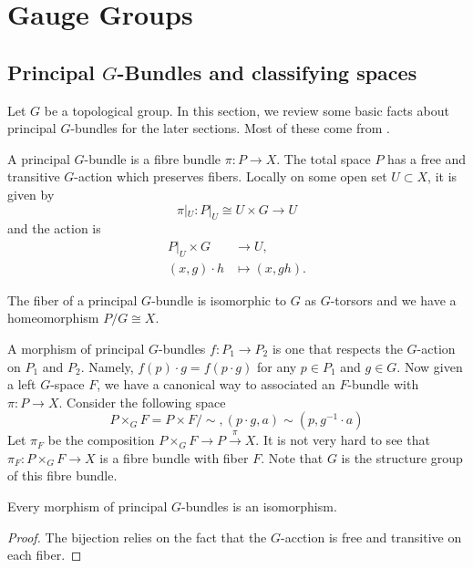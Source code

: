 \chapter{Gauge Groups}

\section{Principal \(G\)-Bundles and classifying spaces}

Let \(G\) be a topological group. In this section, we review some basic facts about principal \(G\)-bundles for the later sections. Most of these come from \cite{husemollerFibreBundles1994}.

\begin{definition}
    A principal \(G\)-bundle is a fibre bundle \(\pi:P\rightarrow X\). The total space \(P\) has a free and transitive \(G\)-action which preserves fibers. Locally on some open set \(U\subset X\), it is given by 
    \[\pi|_U:P|_U\cong U\times G\rightarrow U\] 
    and the action is 
    \begin{align*}
         P|_U\times G&\rightarrow U,\\
         (x,g)\cdot h&\mapsto (x,gh).
    \end{align*}
\end{definition}

\begin{remark}
     The fiber of a principal \(G\)-bundle is isomorphic to \(G\) as \(G\)-torsors and we have a homeomorphism \(P/G\cong X\). 
\end{remark}

A morphism of principal \(G\)-bundles \(f:P_1\rightarrow P_2\) is one that respects the \(G\)-action on \(P_1\) and \(P_2\). Namely, \(f(p)\cdot g=f(p\cdot g)\) for any \(p\in P_1\) and \(g\in G\). Now given a left \(G\)-space \(F\), we have a canonical way to associated an \(F\)-bundle with \(\pi: P\rightarrow X\). Consider the following space 
\[P\times_G F=P\times F/\sim, (p\cdot g,a)\sim (p,g^{-1}\cdot a)\]
Let \(\pi_F\) be the composition \(P\times_G F\rightarrow P\xrightarrow{\pi} X\). It is not very hard to see that \(\pi_F:P\times_G F\rightarrow X\) is a fibre bundle with fiber \(F\). Note that \(G\) is the structure group of this fibre bundle. 

\begin{proposition}
     Every morphism of principal \(G\)-bundles is an isomorphism.
\end{proposition}
\begin{proof}
    The bijection relies on the fact that the \(G\)-acction is free and transitive on each fiber. 
\end{proof}

